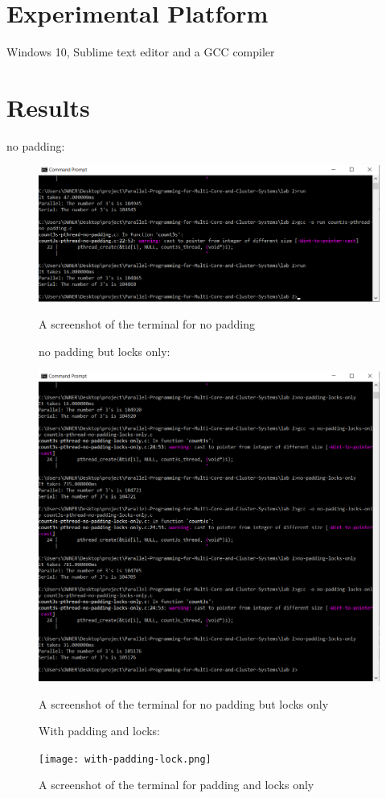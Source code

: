 \documentclass[10pt,a4paper]{article} %
\begin{document}
\section{Experimental Platform}
Windows 10, Sublime text editor and a GCC compiler

\section{Results}

no padding:

\begin{figure}
    \centering
    \includegraphics[width=12cm]{no-padding.png}
    \caption{A screenshot of the terminal for no padding}
    \label{fig:no padding}

no padding but locks only:

    \centering
    \includegraphics[width=12cm]{no-padding-locks.png}
    \caption{A screenshot of the terminal for no padding but locks only}
    \label{fig:locks}

With padding and locks:

    \centering
    \texttt{[image: with-padding-lock.png]}
    \caption{A screenshot of the terminal for padding and locks only}
    \label{fig:paddingLocks}
\end{figure}
\end{document}
